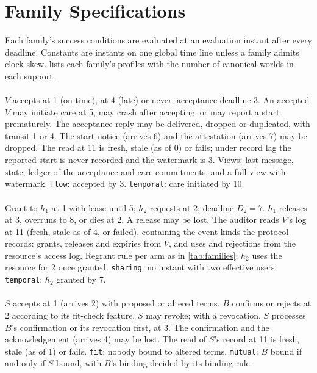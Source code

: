 \section{Family Specifications}
\label{app:families}

Each family's success conditions are evaluated at an evaluation instant after every deadline. Constants are instants on one global time line unless a family admits clock skew.  lists each family's profiles with the number of canonical worlds in each support.

\paragraph{} $V$ accepts at 1 (on time), at 4 (late) or never; acceptance deadline 3. An accepted $V$ may initiate care at 5, may crash after accepting, or may report a start prematurely. The acceptance reply may be delivered, dropped or duplicated, with transit 1 or 4. The start notice (arrives 6) and the attestation (arrives 7) may be dropped. The read at 11 is fresh, stale (as of 0) or fails; under record lag the reported start is never recorded and the watermark is 3. Views: last message, state, ledger of the acceptance and care commitments, and a full view with watermark. \texttt{flow}: accepted by 3. \texttt{temporal}: care initiated by 10.

\paragraph{} Grant to $h_1$ at 1 with lease until 5; $h_2$ requests at 2; deadline $D_2 = 7$. $h_1$ releases at 3, overruns to 8, or dies at 2. A release may be lost. The auditor reads $V$'s log at 11 (fresh, stale as of 4, or failed), containing the event kinds the protocol records: grants, releases and expiries from $V$, and uses and rejections from the resource's access log. Regrant rule per arm as in \cref{tab:families}; $h_2$ uses the resource for 2 once granted. \texttt{sharing}: no instant with two effective users. \texttt{temporal}: $h_2$ granted by 7.

\paragraph{} $S$ accepts at 1 (arrives 2) with proposed or altered terms. $B$ confirms or rejects at 2 according to its fit-check feature. $S$ may revoke; with a revocation, $S$ processes $B$'s confirmation or its revocation first, at 3. The confirmation and the acknowledgement (arrives 4) may be lost. The read of $S$'s record at 11 is fresh, stale (as of 1) or fails. \texttt{fit}: nobody bound to altered terms. \texttt{mutual}: $B$ bound if and only if $S$ bound, with $B$'s binding decided by its binding rule.

